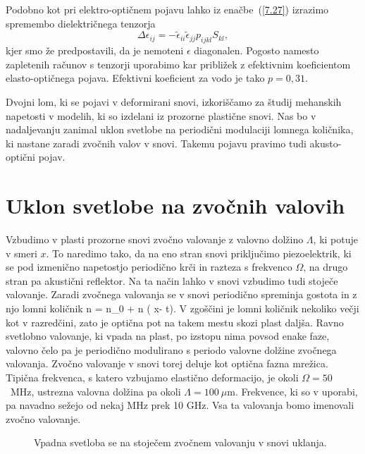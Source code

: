 Podobno kot pri elektro-optičnem pojavu lahko iz enačbe~(\ref{7.27}) izrazimo
spremembo dielektričnega tenzorja 
\begin{equation}
\Delta\epsilon_{ij}=-\tilde{\epsilon}_{ii}\tilde{\epsilon}_{jj}p_{ijkl}S_{kl},
\label{7.29}
\end{equation}
kjer smo že predpostavili, da je nemoteni $\epsilon$ diagonalen. Pogosto namesto zapletenih
računov s tenzorji uporabimo kar približek z efektivnim koeficientom elasto-optičnega pojava. 
Efektivni koeficient za vodo je tako $p = 0,31$.

Dvojni lom, ki se pojavi v deformirani snovi, izkoriščamo za študij
mehanskih napetosti v modelih, ki so izdelani iz prozorne plastične
snovi. Nas bo v nadaljevanju zanimal uklon svetlobe na periodični
modulaciji lomnega količnika, ki nastane zaradi zvočnih valov v snovi. Takemu pojavu
pravimo tudi akusto-optični pojav.

\section{Uklon svetlobe na zvočnih valovih}

Vzbudimo v plasti prozorne snovi zvočno valovanje z valovno dolžino $\Lambda$, ki potuje v smeri $x$.
To naredimo tako, da na eno stran snovi priključimo piezoelektrik, 
ki se pod izmenično napetostjo periodično krči in razteza s frekvenco $\Omega$, 
na drugo stran pa akustični reflektor. Na ta način lahko v snovi vzbudimo tudi stoječe
valovanje. Zaradi zvočnega valovanja se v snovi periodično spreminja gostota in 
z njo lomni količnik
\beq
n = n_0 + \Delta n \sin \left(\frac{2\pi}{\Lambda} x- \Omega t\right).
\eeq
V zgoščini je lomni količnik nekoliko večji kot v razredčini, zato je optična pot na takem mestu
skozi plast daljša. Ravno svetlobno valovanje, ki vpada na plast, po
izstopu nima povsod enake faze, valovno čelo pa je periodično modulirano s periodo 
valovne dolžine zvočnega valovanja. Zvočno valovanje v snovi torej deluje kot 
optična fazna mrežica. Tipična frekvenca, s katero vzbujamo elastično
deformacijo, je okoli $\Omega=50$~MHz, ustrezna valovna dolžina pa okoli $\Lambda = 100~\mu$m. 
Frekvence, ki so v uporabi, pa navadno sežejo od nekaj MHz prek 10 GHz. Vsa ta valovanja bomo 
imenovali zvočno valovanje. 

\begin{figure}[h]
\centering
\def\svgwidth{70truemm} 

\caption{Vpadna svetloba se na stoječem zvočnem valovanju v snovi uklanja.}
\label{fig:ao}
\end{figure}

